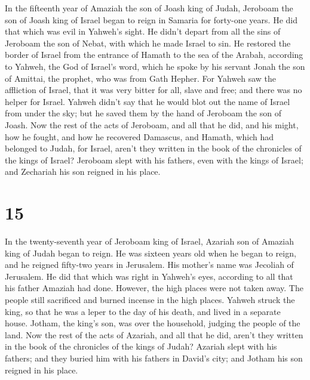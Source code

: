  In the fifteenth year of Amaziah the son of Joash king
of Judah, Jeroboam the son of Joash king of Israel began to reign in
Samaria for forty-one years.  He did that which was evil
in Yahweh's sight. He didn't depart from all the sins of Jeroboam the
son of Nebat, with which he made Israel to sin.  He
restored the border of Israel from the entrance of Hamath to the sea of
the Arabah, according to Yahweh, the God of Israel's word, which he
spoke by his servant Jonah the son of Amittai, the prophet, who was from
Gath Hepher.  For Yahweh saw the affliction of Israel,
that it was very bitter for all, slave and free; and there was no helper
for Israel.  Yahweh didn't say that he would blot out the
name of Israel from under the sky; but he saved them by the hand of
Jeroboam the son of Joash.  Now the rest of the acts of
Jeroboam, and all that he did, and his might, how he fought, and how he
recovered Damascus, and Hamath, which had belonged to Judah, for Israel,
aren't they written in the book of the chronicles of the kings of
Israel?  Jeroboam slept with his fathers, even with the
kings of Israel; and Zechariah his son reigned in his place.

\hypertarget{section-14}{%
\section{15}\label{section-14}}

 In the twenty-seventh year of Jeroboam king of Israel,
Azariah son of Amaziah king of Judah began to reign.  He
was sixteen years old when he began to reign, and he reigned fifty-two
years in Jerusalem. His mother's name was Jecoliah of Jerusalem.
 He did that which was right in Yahweh's eyes, according
to all that his father Amaziah had done.  However, the
high places were not taken away. The people still sacrificed and burned
incense in the high places.  Yahweh struck the king, so
that he was a leper to the day of his death, and lived in a separate
house. Jotham, the king's son, was over the household, judging the
people of the land.  Now the rest of the acts of Azariah,
and all that he did, aren't they written in the book of the chronicles
of the kings of Judah?  Azariah slept with his fathers;
and they buried him with his fathers in David's city; and Jotham his son
reigned in his place.

